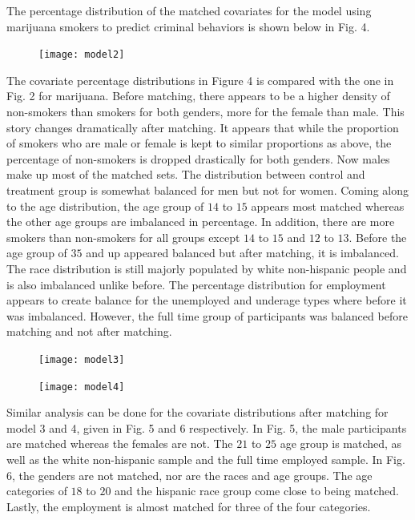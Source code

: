 \documentclass[a4paper, 10pt, conference]{ieeeconf}
\begin{document}
The percentage distribution of the matched covariates for the model using marijuana smokers to predict criminal behaviors is shown below in Fig. 4. \begin{figure}[t!] \texttt{[image: model2]}  \end{figure} The covariate percentage distributions in Figure 4 is compared with the one in Fig. 2 for marijuana. Before matching, there appears to be a higher density of non-smokers than smokers for both genders, more for the female than male. This story changes dramatically after matching. It appears that while the proportion of smokers who are male or female is kept to similar proportions as above, the percentage of non-smokers is dropped drastically for both genders. Now males make up most of the matched sets. The distribution between control and treatment group is somewhat balanced for men but not for women. Coming along to the age distribution, the age group of $14$ to $15$ appears most matched whereas the other age groups are imbalanced in percentage. In addition, there are more smokers than non-smokers for all groups except $14$ to $15$ and $12$ to $13$. Before the age group of $35$ and up appeared balanced but after matching, it is imbalanced. The race distribution is still majorly populated by white non-hispanic people and is also imbalanced unlike before. The percentage distribution for employment appears to create balance for the unemployed and underage types where before it was imbalanced. However, the full time group of participants was balanced before matching and not after matching. 

\begin{figure}[b!] \texttt{[image: model3]}  \end{figure}
\begin{figure}[h!] \texttt{[image: model4]}  \end{figure}
Similar analysis can be done for the covariate distributions after matching for model 3 and 4, given in Fig. 5 and 6 respectively. In Fig. 5, the male participants are matched whereas the females are not. The $21$ to $25$ age group is matched, as well as the white non-hispanic sample and the full time employed sample. In Fig. 6, the genders are not matched, nor are the races and age groups. The age categories of $18$ to $20$ and the hispanic race group come close to being matched. Lastly, the employment is almost matched for three of the four categories. 
\end{document}
